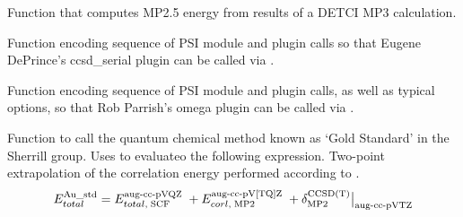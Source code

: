\documentclass[letterpaper,10pt,english]{sphinxmanual}
\begin{document}
\label{index:module-aliases}

\begin{fulllineitems}
\label{index:aliases.run_mp2_5}
Function that computes MP2.5 energy from results of a DETCI
MP3 calculation.

\end{fulllineitems}


\begin{fulllineitems}
\label{index:aliases.run_plugin_ccsd_serial}
Function encoding sequence of PSI module and plugin calls so that
Eugene DePrince's ccsd\_serial plugin can be called via {\hyperref[index:driver.energy]{}}.

\end{fulllineitems}


\begin{fulllineitems}
\label{index:aliases.run_plugin_omega}
Function encoding sequence of PSI module and plugin calls, as well
as typical options, so that Rob Parrish's omega plugin can be called
via {\hyperref[index:driver.energy]{}}.

\end{fulllineitems}


\begin{fulllineitems}
\label{index:aliases.sherrillgroup_gold_standard}
Function to call the quantum chemical method known as `Gold Standard'
in the Sherrill group. Uses {\hyperref[index:wrappers.complete_basis_set]{}} to evaluateo
the following expression. Two-point extrapolation of the correlation energy
performed according to {\hyperref[index:wrappers.corl_xtpl_helgaker_2]{}}.
\begin{gather}
\begin{split}E_{total}^{\text{Au\_std}} = E_{total,\; \text{SCF}}^{\text{aug-cc-pVQZ}} \; + E_{corl,\; \text{MP2}}^{\text{aug-cc-pV[TQ]Z}} \; + \delta_{\text{MP2}}^{\text{CCSD(T)}}\big\vert_{\text{aug-cc-pVTZ}}\end{split}\notag\\\begin{split}\end{split}\notag
\end{gather}
\end{fulllineitems}
\end{document}
